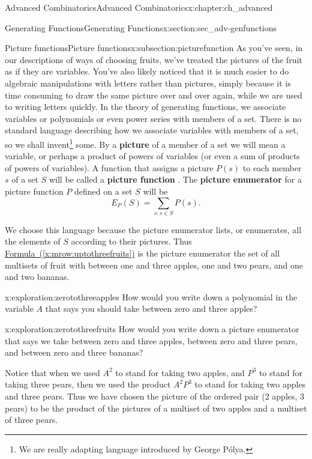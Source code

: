 \documentclass[oneside,10pt,]{book}
\newcommand{\terminology}[1]{\textbf{#1}}
\numberwithin{equation}{chapter}
\begin{document}
\begin{chapterptx}{Advanced Combinatorics}{}{Advanced Combinatorics}{}{}{x:chapter:ch_advanced}
\begin{sectionptx}{Generating Functions}{}{Generating Functions}{}{}{x:section:sec_adv-genfunctions}
\begin{subsectionptx}{Picture functions}{}{Picture functions}{}{}{x:subsection:picturefunction}
As you've seen, in our descriptions of ways of choosing fruits, we've treated the pictures of the fruit as if they are variables. You've also likely noticed that it is much easier to do algebraic manipulations with letters rather than pictures, simply because it is time consuming to draw the same picture over and over again, while we are used to writing letters quickly. In the theory of generating functions, we associate variables or polynomials or even power series with members of a set. There is no standard language describing how we associate variables with members of a set, so we shall invent\footnote{We are really adapting language introduced by George Pólya.\label{g:fn:idm4961}} some. By a \terminology{picture} of a member of a set we will mean a variable, or perhaps a product of powers of variables (or even a sum of products of powers of variables). A function that assigns a picture \(P(s)\) to each member \(s\) of a set \(S\) will be called a \terminology{picture function} . The \terminology{picture enumerator} for a picture function \(P\) defined on a set \(S\) will be%
\begin{equation*}
E_P(S) = \sum_{s: s\in S}  P(s).
\end{equation*}
%
\par
We choose this language because the picture enumerator lists, or enumerates, all the elements of \(S\) according to their pictures. Thus \hyperref[x:mrow:uptothreefruits]{Formula~(\ref{x:mrow:uptothreefruits})} is the picture enumerator the set of all multisets of fruit with between one and three apples, one and two pears, and one and two bananas.%
\begin{exploration}{}{x:exploration:zerotothreeapples}%
How would you write down a polynomial in the variable \(A\) that says you should take between zero and three apples?%
\end{exploration}
\begin{exploration}{}{x:exploration:zerotothreefruits}%
How would you write down a picture enumerator that says we take between zero and three apples, between zero and three pears, and between zero and three bananas?%
\end{exploration}
Notice that when we used \(A^2\) to stand for taking two apples, and \(P^3\) to stand for taking three pears, then we used the product \(A^2P^3\) to stand for taking two apples and three pears. Thus we have chosen the picture of the ordered pair (2 apples, 3 pears) to be the product of the pictures of a multiset of two apples and a multiset of three pears.%

\end{subsectionptx}
\end{sectionptx}
\end{chapterptx}
\end{document}
